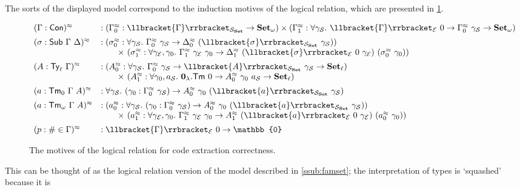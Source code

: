 \documentclass[10pt,a4paper]{article}
\theoremstyle{definition}
\theoremstyle{remark}
\newcommand{\s}[1]{{\ensuremath{\textsf{\upshape #1}}}\xspace}
\newcommand{\cl}[1]{{\ensuremath{\mathcal{#1}}}\xspace}
\newcommand{\re}[1]{{\ensuremath{\mathbf{#1}}}\xspace}
\newcommand{\std}[1]{\ensuremath{\mathbb{#1}}\xspace}
\newcommand{\mth}[1]{\ensuremath{\textbf{\upshape #1}}\xspace}
\newcommand{\Set}{\mth{Set}}
\newcommand{\llb}[1]{\llbracket{#1}\rrbracket}
\begin{document}
The sorts of the displayed model correspond to the induction
motives of the logical relation, which are presented in \cref{fig:logrel}.
\begin{figure}[h]
{$$\begin{array}{ll}
  (\Gamma : \s{Con})^{\approx} &:
    (\Gamma^{\approx}_0 : \llb\Gamma_{\cl S_\Set} \to \Set_{\omega}) \times (\Gamma^{\approx}_1 : \forall \gamma_{\cl S}.\ \llb\Gamma_{\cl E}\ 0
    \to \Gamma^{\approx}_0\ \gamma_{\cl S} \to \Set_{\omega}) \\[0.5em]
  (\sigma : \s{Sub}\ \Gamma\ \Delta)^{\approx} &:
    (\sigma^{\approx}_0 : \forall \gamma_{\cl S}.\ \Gamma^{\approx}_0\ \gamma_{\cl S} \to \Delta^{\approx}_0\ (\llb\sigma_{\cl S_\Set}\ \gamma_{\cl S})) \\
    &\qquad \times\ (\sigma^{\approx}_1 : \forall \gamma_{\cl E},\gamma_0.\ \Gamma^{\approx}_1\ \gamma_{\cl E}\ \gamma_0
    \to \Delta^{\approx}_1\ (\llb\sigma_{\cl E}\ 0\ \gamma_{\cl E})\ (\sigma^{\approx}_0\ \gamma_0)) \\[0.5em]
  (A : \s{Ty}_\ell\ \Gamma)^{\approx} &:
    (A^{\approx}_0 : \forall \gamma_{\cl S}.\ \Gamma^{\approx}_0\ \gamma_{\cl S} \to \llb A_{\cl S_\Set}\ \gamma_{\cl S} \to \Set_{\ell}) \\
    &\qquad \times\ (A^{\approx}_1 : \forall \gamma_0,a_{\cl S}.\ \re 0_\lambda.\s{Tm}\ {0}
    \to A^{\approx}_0\ \gamma_0\ a_{\cl S} \to \Set_{\ell}) \\[0.5em]
  (a : \s{Tm}_0\ \Gamma\ A)^{\approx} &:
    \forall \gamma_{\cl S}.\ (\gamma_0 : \Gamma^{\approx}_0\ \gamma_{\cl S}) \to A^{\approx}_0\ \gamma_0\ (\llb a_{\cl S_\Set}\ \gamma_{\cl S}) \\[0.5em]
  (a : \s{Tm}_\omega\ \Gamma\ A)^{\approx} &:
    (a^{\approx}_0 : \forall \gamma_{\cl S}.\ (\gamma_0 : \Gamma^{\approx}_0\ \gamma_{\cl S}) \to A^{\approx}_0\ \gamma_0\ (\llb a_{\cl S_\Set}\ \gamma_{\cl S})) \\
    &\qquad \times\ (a^{\approx}_1 : \forall \gamma_{\cl E},\gamma_0.\ \Gamma^{\approx}_1\ \gamma_{\cl E}\ \gamma_0
    \to A^{\approx}_1\ (\llb a_{\cl E}\ 0\ \gamma_{\cl E})\ (a^{\approx}_0\ \gamma_0)) \\[0.5em]
  (p : \#\in \Gamma)^{\approx} &: \llb\Gamma_{\cl E}\ 0 \to \std{0}
\end{array}$$}
\caption{The motives of the logical relation for code extraction correctness.}
\label{fig:logrel}
\end{figure}
This can be thought of as the logical relation version of the model described in
\cref{ssub:famset}; the interpretation of types is `squashed' because it is
\end{document}
